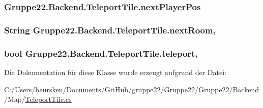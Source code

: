 \hypertarget{class_gruppe22_1_1_backend_1_1_teleport_tile_ab83627306a280afbfadb8441b6df0485}{
\subsubsection[{next\-Player\-Pos}]{ Gruppe22.\-Backend.\-Teleport\-Tile.\-next\-Player\-Pos\hspace{0.3cm}{\ttfamily [get]}}}\label{class_gruppe22_1_1_backend_1_1_teleport_tile_ab83627306a280afbfadb8441b6df0485}
\hypertarget{class_gruppe22_1_1_backend_1_1_teleport_tile_a133def222075e29e9434e8ffb4e4bf1a}{
\subsubsection[{next\-Room}]{\setlength{\rightskip}{0pt plus 5cm}String Gruppe22.\-Backend.\-Teleport\-Tile.\-next\-Room\hspace{0.3cm}{\ttfamily [get]}, {\ttfamily [set]}}}\label{class_gruppe22_1_1_backend_1_1_teleport_tile_a133def222075e29e9434e8ffb4e4bf1a}
\hypertarget{class_gruppe22_1_1_backend_1_1_teleport_tile_aad5853c299ee66afac5565812cabdf52}{
\subsubsection[{teleport}]{\setlength{\rightskip}{0pt plus 5cm}bool Gruppe22.\-Backend.\-Teleport\-Tile.\-teleport\hspace{0.3cm}{\ttfamily [get]}, {\ttfamily [set]}}}\label{class_gruppe22_1_1_backend_1_1_teleport_tile_aad5853c299ee66afac5565812cabdf52}


Die Dokumentation für diese Klasse wurde erzeugt aufgrund der Datei\-:\begin{DoxyCompactItemize}
\item 
C\-:/\-Users/beursken/\-Documents/\-Git\-Hub/gruppe22/\-Gruppe22/\-Gruppe22/\-Backend/\-Map/\hyperlink{_teleport_tile_8cs}{Teleport\-Tile.\-cs}\end{DoxyCompactItemize}
